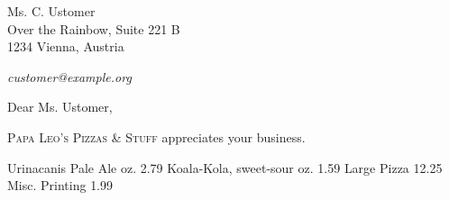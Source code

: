 \documentclass[	backaddress=off,
				paper=letter,
				fontsize=11pt,
				parskip=full]{scrlttr2}
\begin{document}
	\def\payperiod		{14}	%
					\def\invoicenumber	{42}	%
	\begin{letter}{%
%
					Ms. C. Ustomer\\
					Over the Rainbow, Suite 221\kern 1pt B\\
					1234 Vienna, Austria\\				
					\vspace{.25em}\par		%
					 \hfill\emph{customer@example.org}
	}
		\opening{Dear Ms. Ustomer,}

		\textsc{Papa Leo's Pizzas \& Stuff} appreciates your business.%

		\begin{invoice}[N]				%
			\NumbersOff					%
			\SeparatorOff
			\UseDollar

\makeatletter
	\renewcommand*\@amount		{~}					%
	\renewcommand*\@description	{Description}		%
	\renewcommand*\@unitprice	{Unit price}		%
	\renewcommand*\@totalprice	{Total price}		%
	\renewcommand*\@decimalsep	{.}					%

	\renewcommand*\@taxabrv		{Combined Sales Tax}
	\renewcommand*\@sumnet		{Subtotal}	%
	\renewcommand*\@sumtot		{Total}	%
	\renewcommand*\@excl		{}	%

\makeatother
	{Urinacanis Pale Ale		 oz.}	{2.79}
	{Koala-Kola, sweet-sour 	 oz.}	{1.59}
		{Large Pizza}								{12.25}
	{Misc. Printing}							{1.99}

		\end{invoice}



\end{letter}
\end{document}
